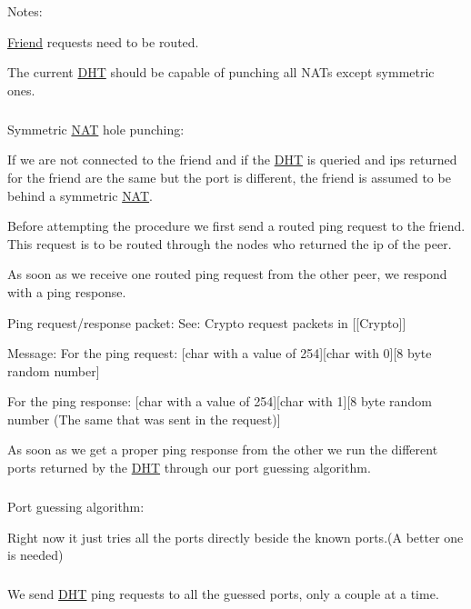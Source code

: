 Notes\+:

\hyperlink{struct_friend}{Friend} requests need to be routed.

The current \hyperlink{struct_d_h_t}{D\+H\+T} should be capable of punching all N\+A\+Ts except symmetric ones.

\subparagraph*{}

Symmetric \hyperlink{struct_n_a_t}{N\+A\+T} hole punching\+:

If we are not connected to the friend and if the \hyperlink{struct_d_h_t}{D\+H\+T} is queried and ips returned for the friend are the same but the port is different, the friend is assumed to be behind a symmetric \hyperlink{struct_n_a_t}{N\+A\+T}.

Before attempting the procedure we first send a routed ping request to the friend. This request is to be routed through the nodes who returned the ip of the peer.

As soon as we receive one routed ping request from the other peer, we respond with a ping response.

Ping request/response packet\+: See\+: Crypto request packets in \mbox{[}\mbox{[}Crypto\mbox{]}\mbox{]}

Message\+: For the ping request\+: \mbox{[}char with a value of 254\mbox{]}\mbox{[}char with 0\mbox{]}\mbox{[}8 byte random number\mbox{]}

For the ping response\+: \mbox{[}char with a value of 254\mbox{]}\mbox{[}char with 1\mbox{]}\mbox{[}8 byte random number (The same that was sent in the request)\mbox{]}

As soon as we get a proper ping response from the other we run the different ports returned by the \hyperlink{struct_d_h_t}{D\+H\+T} through our port guessing algorithm.

\subparagraph*{}

Port guessing algorithm\+:

Right now it just tries all the ports directly beside the known ports.(A better one is needed)

\subparagraph*{}

We send \hyperlink{struct_d_h_t}{D\+H\+T} ping requests to all the guessed ports, only a couple at a time. 